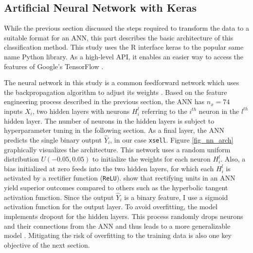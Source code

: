 \documentclass[12pt,a4paper]{article}
\newcommand{\pkg}[1]{{\normalfont\fontseries{b}\selectfont #1}}
\let\proglang=\textsf
\let\code=\texttt
\begin{document}
\subsection{Artificial Neural Network with Keras}

While the previous section discussed the steps required to transform the data to a suitable format for an ANN,
this part describes the basic architecture of this classification method.
This study uses the \proglang{R} interface \pkg{keras} \citep{cholletInterfaceKeras2017} to the popular same name \proglang{Python} library.
As a high-level API, it enables an easier way to access the features of Google's \pkg{TensorFlow} \citep{abadiTensorFlowLargeScaleMachine2015}.

The neural network in this study is a common feedforward network which uses the backpropagation algorithm to adjust its weights \citep{werbosBackpropagationTimeWhat1990}.
Based on the feature engineering process described in the previous section, the ANN has $n_x = 74$ inputs $X_i$, 
two hidden layers with neurons $H_i^l$ referring to the $i^{th}$ neuron in the $l^{th}$ hidden layer. 
The number of neurons in the hidden layers is subject to hyperparameter tuning in the following section.
As a final layer, the ANN predicts the single binary output $\hat{Y}_i$, in our case \code{xsell}.
Figure \ref{fig_nn_arch} graphically visualizes the architecture.
 \label{fig_nn_arch}
This network uses a random uniform distribution $U(-0.05, 0.05)$ to initialize the weights for each neuron $H_i^l$.
Also, a bias initialized at zero feeds into the two hidden layers, for which each $H_i^l$ is activated by a rectifier function (\code{ReLU}).
\cite{glorotDeepSparseRectifier2011} show that rectifying units in an ANN yield superior outcomes compared to others such as the hyperbolic tangent activation function. Since the output $\hat{Y}_i$ is a binary feature, I use a sigmoid activation function for the output layer.
To avoid overfitting, the model implements dropout for the hidden layers.
This process randomly drops neurons and their connections from the ANN and thus leads to a more generalizable model \citep{srivastavaDropoutSimpleWay2014}.
Mitigating the risk of overfitting to the training data is also one key objective of the next section.
\end{document}
